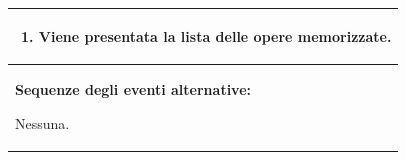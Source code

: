 \documentclass{article}
\begin{document}
\begin{table}[t]
\begin{tabular}{|p{\linewidth}|}
                        \cellcolor{gray!20}
                        \begin{minipage}{\linewidth}
                            \begin{enumerate}[noitemsep]
                                \item Viene presentata la lista delle opere memorizzate.
                            \end{enumerate}
                        \end{minipage} \\
                        \hline
                        \textbf{Sequenze degli eventi alternative:}
                        
                        Nessuna. \\
                        \hline
                    \end{tabular}
                \end{table}
\end{document}
